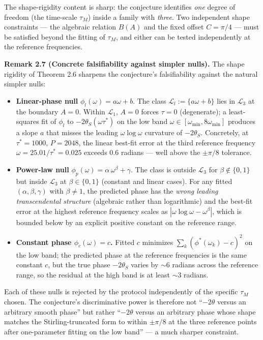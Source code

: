 \documentclass[
  letterpaper,
  11pt]{article}
\providecommand{\tightlist}{%
  \setlength{\itemsep}{0pt}\setlength{\parskip}{0pt}}
\theoremstyle{plain}
\theoremstyle{definition}
\theoremstyle{remark}
\begin{document}
The shape-rigidity content is sharp: the conjecture identifies \emph{one} degree of freedom (the time-scale \(\tau_M\)) inside a family with \emph{three}. Two independent shape constraints --- the algebraic relation \(B(A)\) and the fixed offset \(C = \pi/4\) --- must be satisfied beyond the fitting of \(\tau_M\), and either can be tested independently at the reference frequencies.

\textbf{Remark 2.7 (Concrete falsifiability against simpler nulls).} The shape rigidity of Theorem 2.6 sharpens the conjecture's falsifiability against the natural simpler nulls:

\begin{itemize}
\tightlist
\item
  \textbf{Linear-phase null} \(\phi_l(\omega) = a\omega + b\). The class \(\mathcal{L}_l := \{a\omega + b\}\) lies in \(\mathcal{L}_3\) at the boundary \(A = 0\). Within \(\mathcal{L}_1\), \(A = 0\) forces \(\tau = 0\) (degenerate); a least-squares fit of \(\phi_l\) to \(-2\theta_S(\omega\tau^*)\) on the low band \(\omega \in [\omega_{\min}, 8\omega_{\min}]\) produces a slope \(a\) that misses the leading \(\omega\log\omega\) curvature of \(-2\theta_S\). Concretely, at \(\tau^* = 1000\), \(P = 2048\), the linear best-fit error at the third reference frequency \(\omega = 25.01/\tau^* = 0.025\) exceeds \(0.6\) radians --- well above the \(\pm\pi/8\) tolerance.
\item
  \textbf{Power-law null} \(\phi_p(\omega) = \alpha\,\omega^\beta + \gamma\). The class is outside \(\mathcal{L}_3\) for \(\beta \notin \{0, 1\}\) but inside \(\mathcal{L}_3\) at \(\beta \in \{0, 1\}\) (constant and linear cases). For any fitted \((\alpha, \beta, \gamma)\) with \(\beta \neq 1\), the predicted phase has the \emph{wrong leading transcendental structure} (algebraic rather than logarithmic) and the best-fit error at the highest reference frequency scales as \(|\omega\log\omega - \omega^\beta|\), which is bounded below by an explicit positive constant on the reference range.
\item
  \textbf{Constant phase \(\phi_c(\omega) = c\).} Fitted \(c\) minimizes \(\sum_k (\phi^*(\omega_k) - c)^2\) on the low band; the predicted phase at the reference frequencies is the same constant \(c\), but the true phase \(-2\theta_S\) varies by \(\sim 6\) radians across the reference range, so the residual at the high band is at least \(\sim 3\) radians.
\end{itemize}

Each of these nulls is rejected by the protocol independently of the specific \(\tau_M\) chosen. The conjecture's discriminative power is therefore not ``\(-2\theta\) versus an arbitrary smooth phase'' but rather ``\(-2\theta\) versus an arbitrary phase whose shape matches the Stirling-truncated form to within \(\pm\pi/8\) at the three reference points after one-parameter fitting on the low band'' --- a much sharper constraint.
\end{document}
